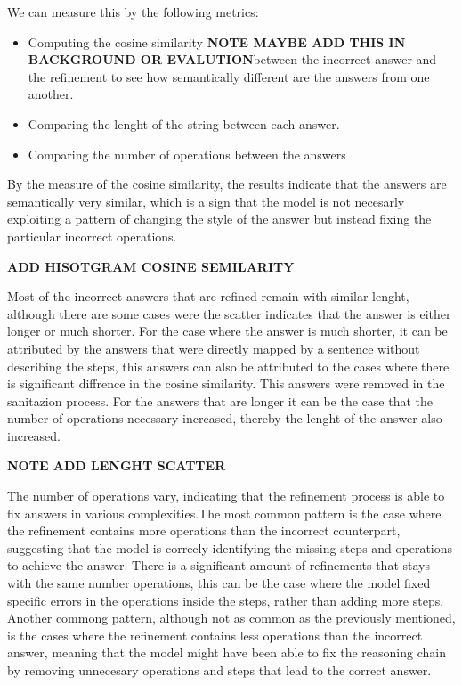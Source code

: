 \documentclass[a4paper,10pt]{article}
\begin{document}
We can measure this by the following metrics:
\begin{itemize}
 \item Computing the cosine similarity \textbf{NOTE MAYBE ADD THIS IN BACKGROUND OR EVALUTION}between the incorrect answer and the refinement to see how semantically different are the answers from one another.
 \item Comparing the lenght of the string between each answer.
 \item Comparing the number of operations between the answers
\end{itemize}

By the measure of the cosine similarity, the results indicate that the answers are semantically very similar, which is a sign that the model is not necesarly exploiting a pattern of changing the style of the answer but instead fixing the particular incorrect operations.

\textbf{ADD HISOTGRAM COSINE SEMILARITY}

Most of the incorrect answers that are refined remain with similar lenght, although there are some cases were the scatter indicates that the answer is either longer or much shorter. For the case where the answer is much shorter, it can be attributed by the answers that were directly mapped by a sentence without describing the steps, this answers can also be attributed to the cases where there is significant diffrence in the cosine similarity. This answers were removed in the sanitazion process. For the answers that are longer it can be the case that the number of operations necessary increased, thereby the lenght of the answer also increased.

\textbf{NOTE ADD LENGHT SCATTER}

The number of operations vary, indicating that the refinement process is able to fix answers in various complexities.The most common pattern is the case where the refinement contains more operations than the incorrect counterpart, suggesting that the model is correcly identifying the missing steps and operations to achieve the answer. There is a significant amount of refinements that stays with the same number operations, this can be the case where the model fixed specific errors in the operations inside the steps, rather than adding more steps. Another commong pattern, although not as common as the previously mentioned, is the cases where the refinement contains less operations than the incorrect answer, meaning that the model might have been able to fix the reasoning chain by removing unnecesary operations and steps that lead to the correct answer.
\end{document}

